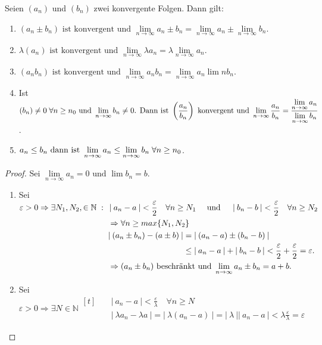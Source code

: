 \documentclass[a4paper,titlepage,oneside]{article}
\def\N{\ensuremath{\mathbb{N}} }
\renewcommand{\epsilon}{\ensuremath{\varepsilon} }
\def\sp{\hspace{0,1cm}}
\def\spcolon{\sp:\sp}
\renewcommand{\liminf}[2][n]{\ensuremath{\lim\limits_{#1 \rightarrow \infty}{#2}}}
\newcommand{\abs}[1]{\ensuremath{\left|\:#1\:\right|}}
\theoremstyle{thmstyle}
\begin{document}
\newpage
\begin{subsatz}
Seien \((a_n)\) und \((b_n)\) zwei konvergente Folgen. Dann gilt:
\begin{enumerate}
\item \((a_n \pm b_n)\text{ ist konvergent und }\liminf{a_n  \pm  b_n} = \liminf{a_n}  \pm \liminf{b_n}\).
\item \(\lambda (a_n)\text{ ist konvergent und }\liminf{\lambda a_n} = \lambda \liminf{a_n}\).
\item \((a_n b_n)\text{ ist konvergent und }\liminf{a_n b_n} = \liminf{a_n} \lim{n}{b_n}\).
\item Ist $ \displaystyle (b_n) \ne 0 \sp \forall n \ge n_0\text{ und }\liminf{b_n} \ne 0\text{. Dann ist } \left(\frac{a_n}{b_n}\right) \text{ konvergent und }\liminf{\frac{a_n}{b_n}} = \frac{\liminf{a_n}}{\liminf{b_n}}$.
\item \(a_n \le b_n \text{ dann ist }\liminf{a_n} \le \liminf{b_n} \sp \forall n \ge n_0\).
\end{enumerate}
\begin{proof}
Sei \(\liminf{a_n} = 0\text{ und } \lim{b_n} = b\).
\begin{enumerate}
\item Sei $\epsilon > 0 \Rightarrow \exists N_1, N_2, \in \N \spcolon
\begin{aligned}[t]
&\abs{a_n - a} < \frac{\epsilon}{2} \quad \forall n \ge N_1 \quad \text{ und } \quad  \abs{b_n - b} < \frac{\epsilon}{2} \quad \forall n \ge N_2\\
&\Rightarrow \forall n \ge max\{N_1, N_2\}\\
& \begin{aligned}[t]
\abs{(a_n \pm b_n) - (a \pm b)} &= \abs{(a_n - a) \pm (b_n - b)} \\
&\le \abs{a_n - a} + \abs{b_n - b} < \frac{\epsilon}{2} + \frac{\epsilon}{2} = \epsilon.
\end{aligned}\\
&\Rightarrow (a_n \pm b_n) \text{ beschränkt und } \liminf{a_n \pm b_n} = a+b.
\end{aligned}$
\item Sei $ \displaystyle \epsilon > 0 \Rightarrow \exists N \in \N \begin{aligned}[t] \quad
		&\abs{a_n - a} < \frac{\epsilon}{\lambda} \quad \forall n \ge N\\
		& \abs{\lambda a_n - \lambda a} = \abs{\lambda(a_n - a)} = \abs{\lambda}\abs{a_n - a} < \lambda \frac{\epsilon}{\lambda} = \epsilon
		\end{aligned}$

\end{enumerate}
\end{proof}
\end{subsatz}
\end{document}
